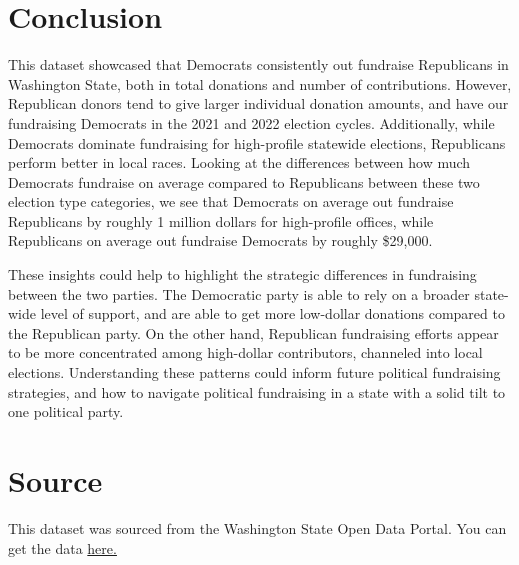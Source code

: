 \documentclass[9pt, compsoc, technote, a4paper]{IEEEtran}
\begin{document}
\section{Conclusion}
This dataset showcased that Democrats consistently out fundraise Republicans in Washington State, both in total donations and number of contributions. However, Republican donors tend to give larger individual donation amounts, and have our fundraising Democrats in the 2021 and 2022 election cycles. Additionally, while Democrats dominate fundraising for high-profile statewide elections, Republicans perform better in local races. Looking at the differences between how much Democrats fundraise on average compared to Republicans between these two election type categories, we see that Democrats on average out fundraise Republicans by roughly 1 million dollars for high-profile offices, while Republicans on average out fundraise Democrats by roughly \$29,000.

These insights could help to highlight the strategic differences in fundraising between the two parties. The Democratic party is able to rely on a broader state-wide level of support, and are able to get more low-dollar donations compared to the Republican party. On the other hand, Republican fundraising efforts appear to be more concentrated among high-dollar contributors, channeled into local elections. Understanding these patterns could inform future political fundraising strategies, and how to navigate political fundraising in a state with a solid tilt to one political party. 


\section{Source}
This dataset was sourced from the Washington State Open Data Portal. You can get the data \href{https://catalog.data.gov/dataset/contributions-to-candidates-and-political-committees}{here.}
\end{document}
